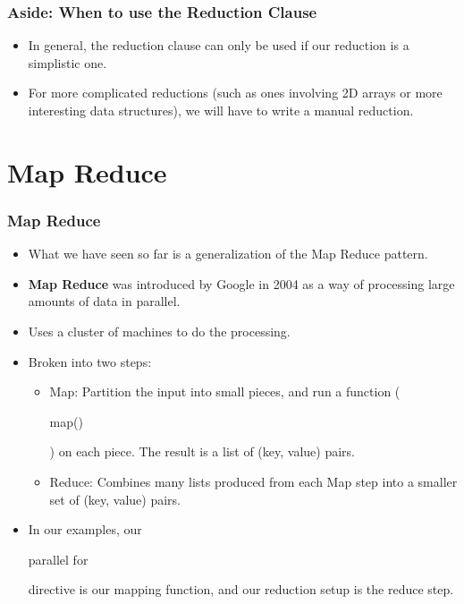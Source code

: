 \documentclass[table]{beamer}
\newcommand{\ttt}[1]{\begin{tt}#1\end{tt}}
\begin{document}
\begin{frame}
    \frametitle{Aside: When to use the Reduction Clause}
    \begin{itemize}
        \item<1-> In general, the reduction clause can only be used if our 
        reduction is a simplistic one.
        \item<2-> For more complicated reductions (such as ones involving 
        2D arrays or more interesting data structures), we will have to 
        write a manual reduction.
    \end{itemize}
\end{frame}

\section{Map Reduce}
\begin{frame}
    \frametitle{Map Reduce}
    \begin{itemize}
        \item<1-> What we have seen so far is a generalization of the Map 
        Reduce pattern.
        \item<2-> \textbf{Map Reduce} was introduced by Google in 2004 as a 
        way of processing large amounts of data in parallel.
        \item<3-> Uses a cluster of machines to do the processing.
        \item<4-> Broken into two steps:
        \begin{itemize}
            \item<5-> Map: Partition the input into small pieces, and run a 
            function (\ttt{map()}) on each piece. The result is a list of 
            (key, value) pairs.
            \item<6-> Reduce: Combines many lists produced from each Map 
            step into a smaller set of (key, value) pairs.
        \end{itemize}
        \item<7-> In our examples, our \ttt{parallel for} directive is our 
        mapping function, and our reduction setup is the reduce step.
    \end{itemize}
\end{frame}
\end{document}
